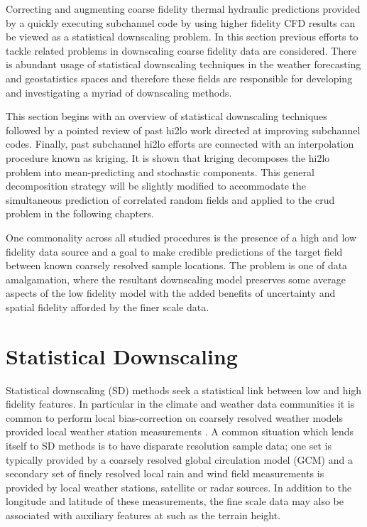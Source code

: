 
Correcting and augmenting coarse fidelity thermal hydraulic predictions provided by a quickly executing subchannel code by using higher fidelity CFD results can be viewed as a statistical downscaling problem.  In this section previous efforts to tackle related problems in downscaling coarse fidelity data are considered. There is abundant usage of statistical downscaling techniques in the weather forecasting and geostatistics spaces and therefore these fields are responsible for developing and investigating a myriad of downscaling methods.  

This section begins with an overview of statistical downscaling techniques followed by a pointed review of past hi2lo work directed at improving subchannel codes.  Finally, past subchannel hi2lo efforts are connected with an interpolation procedure known as kriging.  It is shown that kriging decomposes the hi2lo problem into mean-predicting and stochastic components.  This general decomposition strategy will be slightly modified to accommodate the simultaneous prediction of correlated random fields and applied to the crud problem in the following chapters.

One commonality across all studied procedures is the presence of a high and low fidelity data source and a goal to make credible predictions of the target field between known coarsely resolved sample locations.  The problem is one of data amalgamation, where the resultant downscaling model preserves some average aspects of the low fidelity model with the added benefits of uncertainty and spatial fidelity afforded by the finer scale data.

\section{Statistical Downscaling}

Statistical downscaling (SD) methods seek a statistical link between low and high fidelity features.  
In particular in the climate and weather data communities it is common to perform local bias-correction on coarsely resolved weather models provided local weather station measurements \cite{wilby1998} \cite{arelia2016} \cite{goly2014}. A common situation which lends itself to SD methods is to have disparate resolution sample data; one set is typically provided by a coarsely resolved global circulation model (GCM) and a secondary set of finely resolved local rain and wind field measurements is provided by local weather stations, satellite or radar sources.  In addition to the longitude and latitude of these measurements, the fine scale data may also be associated with auxiliary features at such as the terrain height.

